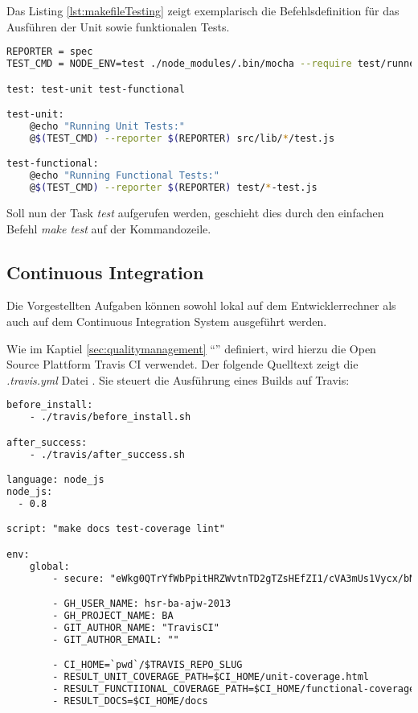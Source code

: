 Das Listing \ref{lst:makefileTesting} zeigt exemplarisch die Befehlsdefinition für das Ausführen der Unit sowie funktionalen Tests.

\begin{lstlisting}[language=Bash, caption=Ausschnitt Makefile: Testing \cite{RoomiesMakefile}, label=lst:makefileTesting]
REPORTER = spec
TEST_CMD = NODE_ENV=test ./node_modules/.bin/mocha --require test/runner.js --globals config

test: test-unit test-functional

test-unit:
	@echo "Running Unit Tests:"
	@$(TEST_CMD) --reporter $(REPORTER) src/lib/*/test.js

test-functional:
	@echo "Running Functional Tests:"
	@$(TEST_CMD) --reporter $(REPORTER) test/*-test.js
\end{lstlisting}

Soll nun der Task \emph{test} aufgerufen werden, geschieht dies durch den einfachen Befehl \emph{make test} auf der Kommandozeile.


\subsection*{Continuous Integration}
Die Vorgestellten Aufgaben können sowohl lokal auf dem Entwicklerrechner als auch auf dem Continuous Integration System ausgeführt werden.

Wie im Kaptiel \ref{sec:qualitymanagement} ``'' definiert, wird hierzu die Open Source Plattform Travis CI \cite{TravisCI} verwendet. Der folgende Quelltext zeigt die \emph{.travis.yml} Datei \cite{RoomiesTravisYML}. Sie steuert die Ausführung eines Builds auf Travis:

\begin{lstlisting}[language=XML, caption=.travis.yml \cite{RoomiesTravisYML}, label=lst:roomiesTravisYML]
before_install:
    - ./travis/before_install.sh

after_success:
    - ./travis/after_success.sh

language: node_js
node_js:
  - 0.8

script: "make docs test-coverage lint"

env:
    global:
        - secure: "eWkg0QTrYfWbPpitHRZWvtnTD2gTZsHEfZI1/cVA3mUs1Vycx/bNHzAt4fNm\nWR7EsTkaNLkc6p3JA797kwIyCugt+0D2tTdn7ra532Gye9u/KGjJB38HuJ0A\nQxibB+ahyAOJL+NjRNAQsME2lFmNv950/4sRbXYybijxJD6fqcw="

        - GH_USER_NAME: hsr-ba-ajw-2013
        - GH_PROJECT_NAME: BA
        - GIT_AUTHOR_NAME: "TravisCI"
        - GIT_AUTHOR_EMAIL: ""

        - CI_HOME=`pwd`/$TRAVIS_REPO_SLUG
        - RESULT_UNIT_COVERAGE_PATH=$CI_HOME/unit-coverage.html
        - RESULT_FUNCTIIONAL_COVERAGE_PATH=$CI_HOME/functional-coverage.html
        - RESULT_DOCS=$CI_HOME/docs
\end{lstlisting}